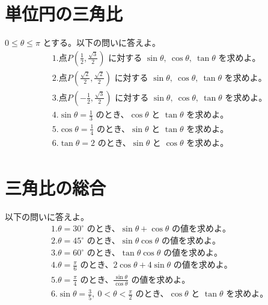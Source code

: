 \documentclass[paper=b4j,landscape,twocolumn,fleqn]{jlreq}
\begin{document}
\section{単位円の三角比}
0$\leq\theta\leq\pi$ とする。以下の問いに答えよ。
\begin{align*}
　&1.　点P\left(\frac{1}{2},\frac{\sqrt{3}}{2}\right)\text{ に対する }\sin\theta,\ \cos\theta,\ \tan\theta\text{ を求めよ。}\\[0.45em]
　&2.　点P\left(\frac{\sqrt{2}}{2},\frac{\sqrt{2}}{2}\right)\text{ に対する }\sin\theta,\ \cos\theta,\ \tan\theta\text{ を求めよ。}\\[0.45em]
　&3.　点P\left(-\frac{1}{2},\frac{\sqrt{3}}{2}\right)\text{ に対する }\sin\theta,\ \cos\theta,\ \tan\theta\text{ を求めよ。}\\[0.45em]
　&4.　\sin\theta=\frac{1}{3}\text{ のとき、}\cos\theta\text{ と }\tan\theta\text{ を求めよ。}\\[0.45em]
　&5.　\cos\theta=\frac{1}{4}\text{ のとき、}\sin\theta\text{ と }\tan\theta\text{ を求めよ。}\\[0.45em]
　&6.　\tan\theta=2\text{ のとき、}\sin\theta\text{ と }\cos\theta\text{ を求めよ。}\\[0.45em]
\end{align*}

\section{三角比の総合}
以下の問いに答えよ。
\begin{align*}
　&1.　\theta=30^\circ\text{ のとき、}\sin\theta+\cos\theta\text{ の値を求めよ。}\\[0.45em]
　&2.　\theta=45^\circ\text{ のとき、}\sin\theta\cos\theta\text{ の値を求めよ。}\\[0.45em]
　&3.　\theta=60^\circ\text{ のとき、}\tan\theta\cos\theta\text{ の値を求めよ。}\\[0.45em]
　&4.　\theta=\frac{\pi}{6}\text{ のとき、}2\cos\theta+4\sin\theta\text{ の値を求めよ。}\\[0.45em]
　&5.　\theta=\frac{\pi}{4}\text{ のとき、}\frac{\sin\theta}{\cos\theta}\text{ の値を求めよ。}\\[0.45em]
　&6.　\sin\theta=\frac{3}{5},\ 0<\theta<\frac{\pi}{2}\text{ のとき、}\cos\theta\text{ と }\tan\theta\text{ を求めよ。}\\[0.45em]
\end{align*}
\end{document}
